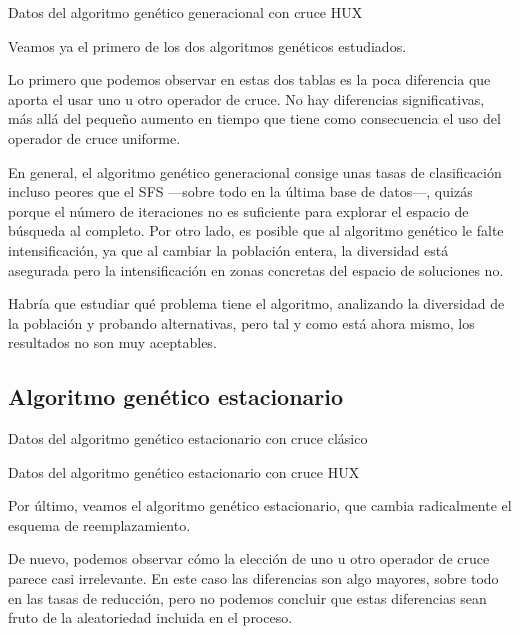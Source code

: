 \documentclass[a4paper, 11pt, titlepage]{article}
\begin{document}
    \begin{table}[!htb]
        \maketable{\dataAGGHUX}
        \caption{Datos del algoritmo genético generacional con cruce HUX}
        \label{tablaAGGHUX}
    \end{table}

    Veamos ya el primero de los dos algoritmos genéticos estudiados.

    Lo primero que podemos observar en estas dos tablas es la poca diferencia que aporta el usar uno u otro operador de cruce. No hay diferencias significativas, más allá del pequeño aumento en tiempo que tiene como consecuencia el uso del operador de cruce uniforme.

    En general, el algoritmo genético generacional consige unas tasas de clasificación incluso peores que el SFS ---sobre todo en la última base de datos---, quizás porque el número de iteraciones no es suficiente para explorar el espacio de búsqueda al completo. Por otro lado, es posible que al algoritmo genético le falte intensificación, ya que al cambiar la población entera, la diversidad está asegurada pero la intensificación en zonas concretas del espacio de soluciones no.

    Habría que estudiar qué problema tiene el algoritmo, analizando la diversidad de la población y probando alternativas, pero tal y como está ahora mismo, los resultados no son muy aceptables.

    \subsection{Algoritmo genético estacionario}
    \begin{table}[!htb]
        \maketable{\dataAGE}
        \caption{Datos del algoritmo genético estacionario con cruce clásico}
        \label{tablaAGE}
    \end{table}

    \begin{table}[!htb]
        \maketable{\dataAGEHUX}
        \caption{Datos del algoritmo genético estacionario con cruce HUX}
        \label{tablaAGEHUX}
    \end{table}

    Por último, veamos el algoritmo genético estacionario, que cambia radicalmente el esquema de reemplazamiento.

    De nuevo, podemos observar cómo la elección de uno u otro operador de cruce parece casi irrelevante. En este caso las diferencias son algo mayores, sobre todo en las tasas de reducción, pero no podemos concluir que estas diferencias sean fruto de la aleatoriedad incluida en el proceso.
\end{document}
